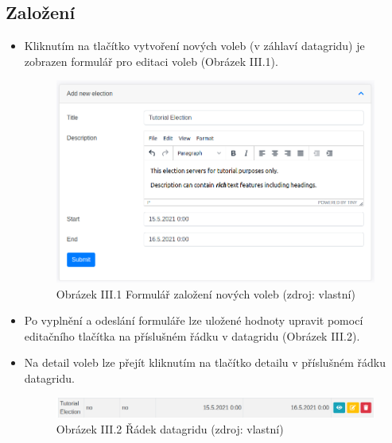 \subsection*{Založení}
\begin{itemize}
	\item Kliknutím na tlačítko vytvoření nových voleb (v záhlaví datagridu) je zobrazen formulář pro editaci voleb (Obrázek III.1).
\begin{figure}[h]
	\centering
	\includegraphics[width=\linewidth]{graphics/attachements/noveVolbyForm.png}
	\captionsetup{width=\linewidth}
	\caption*{Obrázek III.1 Formulář založení nových voleb (zdroj: vlastní)}
\end{figure}
	\item Po vyplnění a odeslání formuláře lze uložené hodnoty upravit pomocí editačního tlačítka na příslušném řádku v datagridu (Obrázek III.2).
	\item Na detail voleb lze přejít kliknutím na tlačítko detailu v příslušném řádku datagridu.
\begin{figure}[h]
	\centering
	\includegraphics[width=\linewidth]{graphics/attachements/noveVolbyGrid.png}
	\captionsetup{width=\linewidth}
	\caption*{Obrázek III.2 Řádek datagridu (zdroj: vlastní)}
\end{figure}
\end{itemize}

\clearpage

